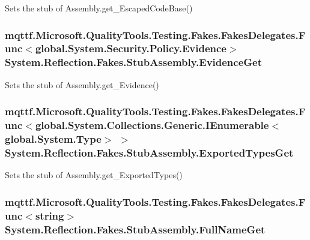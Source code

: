 Sets the stub of Assembly.\-get\-\_\-\-Escaped\-Code\-Base()

\hypertarget{class_system_1_1_reflection_1_1_fakes_1_1_stub_assembly_adf28e2437c1f3e6b00f4305d84d69644}{
\subsubsection[{Evidence\-Get}]{\setlength{\rightskip}{0pt plus 5cm}mqttf.\-Microsoft.\-Quality\-Tools.\-Testing.\-Fakes.\-Fakes\-Delegates.\-Func$<$global.\-System.\-Security.\-Policy.\-Evidence$>$ System.\-Reflection.\-Fakes.\-Stub\-Assembly.\-Evidence\-Get}}\label{class_system_1_1_reflection_1_1_fakes_1_1_stub_assembly_adf28e2437c1f3e6b00f4305d84d69644}


Sets the stub of Assembly.\-get\-\_\-\-Evidence()

\hypertarget{class_system_1_1_reflection_1_1_fakes_1_1_stub_assembly_af57cfff941a84036253c073b9d6f089e}{
\subsubsection[{Exported\-Types\-Get}]{\setlength{\rightskip}{0pt plus 5cm}mqttf.\-Microsoft.\-Quality\-Tools.\-Testing.\-Fakes.\-Fakes\-Delegates.\-Func$<$global.\-System.\-Collections.\-Generic.\-I\-Enumerable$<$global.\-System.\-Type$>$ $>$ System.\-Reflection.\-Fakes.\-Stub\-Assembly.\-Exported\-Types\-Get}}\label{class_system_1_1_reflection_1_1_fakes_1_1_stub_assembly_af57cfff941a84036253c073b9d6f089e}


Sets the stub of Assembly.\-get\-\_\-\-Exported\-Types()

\hypertarget{class_system_1_1_reflection_1_1_fakes_1_1_stub_assembly_a979eef9dc939e45874ebc98f363106bd}{
\subsubsection[{Full\-Name\-Get}]{\setlength{\rightskip}{0pt plus 5cm}mqttf.\-Microsoft.\-Quality\-Tools.\-Testing.\-Fakes.\-Fakes\-Delegates.\-Func$<$string$>$ System.\-Reflection.\-Fakes.\-Stub\-Assembly.\-Full\-Name\-Get}}\label{class_system_1_1_reflection_1_1_fakes_1_1_stub_assembly_a979eef9dc939e45874ebc98f363106bd}


